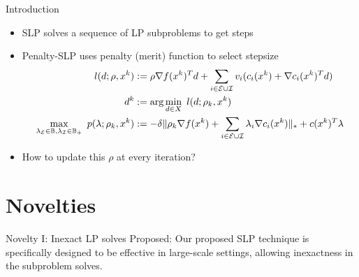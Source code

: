 \documentclass[8pt]{beamer}
\begin{document}
	\begin{frame}[c]{Introduction}
		\vfill
		\begin{itemize}
			\item SLP solves a sequence of LP subproblems to get steps
			\item Penalty-SLP uses penalty (merit) function to select stepsize
		\begin{equation}\begin{aligned} 
			l(d; \rho, x^k) & := \rho \nabla f(x^k)^Td + \sum_{i\in{\cal E}\cup{\cal I}} v_i( c_i(x^k) + \nabla c_i(x^k)^Td)\\
			d^k & := \arg\min_{d \in X}\ l(d; \rho_k, x^k)\\
			\max_{\lambda_{{\cal E}} \in \mathbb{B}, \lambda_{{\cal I}}\in\mathbb{B}_+}\ p(\lambda; \rho_k, x^k) & :=  -\delta \|\rho_k \nabla f(x^k)+\sum_{i\in{\cal E}\cup{\cal I}}\lambda_i \nabla c_i(x^k) \|_* + c(x^k)^T\lambda
		\end{aligned}\end{equation}
		\item How to update this $\rho$ at every iteration? 
		\end{itemize}
	\end{frame}



\section[Novelties]{Novelties}

	\begin{frame}[c]{Novelty I: Inexact LP solves}
		\vfill
		{\red  \leftpointright Proposed: } 
		Our proposed SLP technique is specifically designed to be effective in large-scale settings, allowing {\red inexactness} in the subproblem solves. 
		\vfill
	\end{frame}
\end{document}

